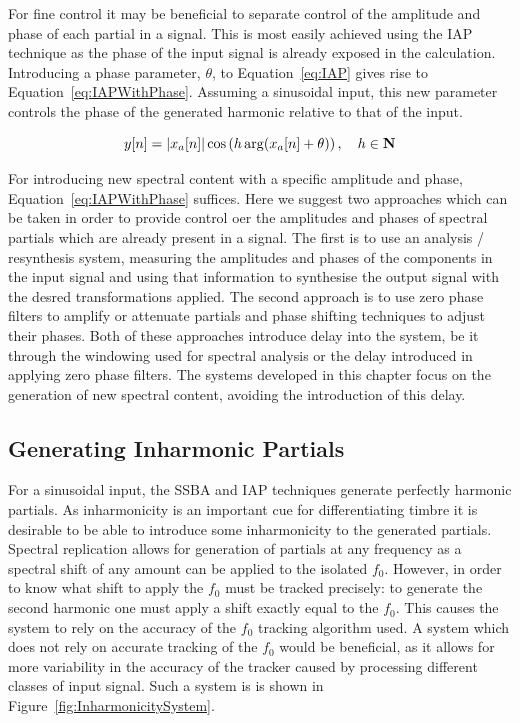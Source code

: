 		For fine control it may be beneficial to separate control of the amplitude and phase of each partial in a
		signal. This is most easily achieved using the IAP technique as the phase of the input signal is already
		exposed in the calculation. Introducing a phase parameter, $\theta$, to Equation~\ref{eq:IAP} gives rise to
		Equation~\ref{eq:IAPWithPhase}. Assuming a sinusoidal input, this new parameter controls the phase of the
		generated harmonic relative to that of the input. 

		\begin{equation}
			y[n] = \left|x_{a}[n]\right| \cos \left( h\arg(x_{a}[n] + \theta) \right), \quad h \in \textbf{N}
			\label{eq:IAPWithPhase}
		\end{equation}

		For introducing new spectral content with a specific amplitude and phase, Equation~\ref{eq:IAPWithPhase}
		suffices. Here we suggest two approaches which can be taken in order to provide control oer the amplitudes
		and phases of spectral partials which are already present in a signal. The first is to use an analysis /
		resynthesis system, measuring the amplitudes and phases of the components in the input signal and using
		that information to synthesise the output signal with the desred transformations applied.  The second
		approach is to use zero phase filters to amplify or attenuate partials and phase shifting techniques to
		adjust their phases. Both of these approaches introduce delay into the system, be it through the windowing
		used for spectral analysis or the delay introduced in applying zero phase filters. The systems developed in
		this chapter focus on the generation of new spectral content, avoiding the introduction of this delay.

	\subsection{Generating Inharmonic Partials}
	\label{sec:FeatureControl-Systems-Inharmonicity}
		For a sinusoidal input, the SSBA and IAP techniques generate perfectly harmonic partials. As inharmonicity
		is an important cue for differentiating timbre it is desirable to be able to introduce some inharmonicity
		to the generated partials. Spectral replication allows for generation of partials at any frequency as a
		spectral shift of any amount can be applied to the isolated $f_{0}$. However, in order to know what shift
		to apply the $f_{0}$ must be tracked precisely: to generate the second harmonic one must apply a shift
		exactly equal to the $f_{0}$. This causes the system to rely on the accuracy of the $f_{0}$ tracking
		algorithm used. A system which does not rely on accurate tracking of the $f_{0}$ would be beneficial, as it
		allows for more variability in the accuracy of the tracker caused by processing different classes of input
		signal. Such a system is is shown in Figure~\ref{fig:InharmonicitySystem}.

